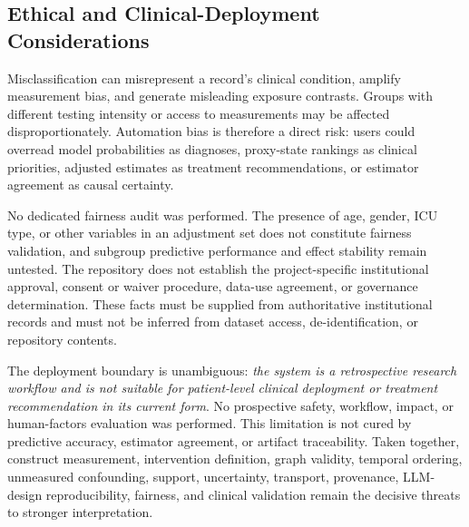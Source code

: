 \subsection{Ethical and Clinical-Deployment Considerations}
\label{subsec:discussion:ethics-deployment}

Misclassification can misrepresent a record's clinical condition, amplify measurement bias, and generate misleading exposure contrasts.  Groups with different testing intensity or access to measurements may be affected disproportionately.  Automation bias is therefore a direct risk: users could overread model probabilities as diagnoses, proxy-state rankings as clinical priorities, adjusted estimates as treatment recommendations, or estimator agreement as causal certainty.

No dedicated fairness audit was performed.  The presence of age, gender, ICU type, or other variables in an adjustment set does not constitute fairness validation, and subgroup predictive performance and effect stability remain untested.  The repository does not establish the project-specific institutional approval, consent or waiver procedure, data-use agreement, or governance determination.  These facts must be supplied from authoritative institutional records and must not be inferred from dataset access, de-identification, or repository contents.

The deployment boundary is unambiguous: \emph{the system is a retrospective research workflow and is not suitable for patient-level clinical deployment or treatment recommendation in its current form}.  No prospective safety, workflow, impact, or human-factors evaluation was performed.  This limitation is not cured by predictive accuracy, estimator agreement, or artifact traceability.  Taken together, construct measurement, intervention definition, graph validity, temporal ordering, unmeasured confounding, support, uncertainty, transport, provenance, LLM-design reproducibility, fairness, and clinical validation remain the decisive threats to stronger interpretation.
